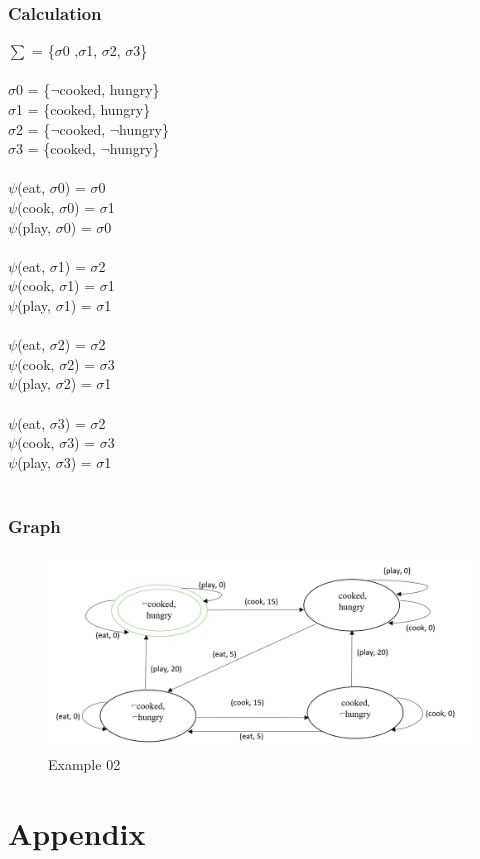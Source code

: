\documentclass[11pt]{article}
\begin{document}
	\subsubsection{Calculation}\label{par:p303}
	$\sum$ = \{$\sigma$0 ,$\sigma$1, $\sigma$2, $\sigma$3\}\\
	\\
	$\sigma$0 = \{$\neg$cooked, hungry\}\\
	$\sigma$1 = \{cooked, hungry\}\\
	$\sigma$2 = \{$\neg$cooked, $\neg$hungry\}\\
	$\sigma$3 = \{cooked, $\neg$hungry\}\\
	\\
	$\psi$(eat, $\sigma$0) = $\sigma$0\\
	$\psi$(cook, $\sigma$0) = $\sigma$1\\
	$\psi$(play, $\sigma$0) = $\sigma$0\\
	\\
	$\psi$(eat, $\sigma$1) = $\sigma$2\\
	$\psi$(cook, $\sigma$1) = $\sigma$1\\
	$\psi$(play, $\sigma$1) = $\sigma$1\\
	\\
	$\psi$(eat, $\sigma$2) = $\sigma$2\\
	$\psi$(cook, $\sigma$2) = $\sigma$3\\
	$\psi$(play, $\sigma$2) = $\sigma$1\\
	\\
	$\psi$(eat, $\sigma$3) = $\sigma$2\\
	$\psi$(cook, $\sigma$3) = $\sigma$3\\
	$\psi$(play, $\sigma$3) = $\sigma$1\\
	\\
	\subsubsection{Graph}\label{par:p403}
	\begin{figure}[H]
		\includegraphics[width=1\linewidth, height=0.3\textheight]{./media/figure01.png}
		\caption{Example 02}
		\label{Figure:f03}
	\end{figure}
\newpage
\section{Appendix}	
\begin{appendix}
\listoffigures
\listoftables
\end{appendix}
\end{document}
